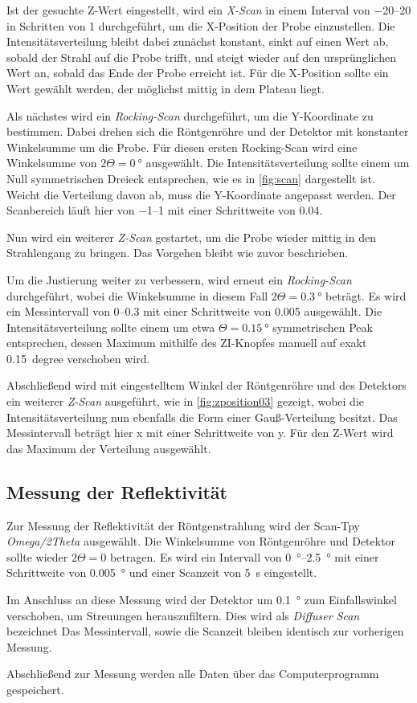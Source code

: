 Ist der gesuchte Z-Wert eingestellt,
wird ein \emph{X-Scan} in einem Interval von \numrange{-20}{20} in Schritten von \num{1} durchgeführt,
um die X-Position der Probe einzustellen.
Die Intensitätsverteilung bleibt dabei zunächst konstant,
sinkt auf einen Wert ab,
sobald der Strahl auf die Probe trifft,
und steigt wieder auf den ursprünglichen Wert an,
sobald das Ende der Probe erreicht ist.
Für die X-Position sollte ein Wert gewählt werden,
der möglichst mittig in dem Plateau liegt.

Als nächstes wird ein \emph{Rocking-Scan} durchgeführt,
um die Y-Koordinate zu bestimmen.
Dabei drehen sich die Röntgenröhre und der Detektor mit konstanter Winkelsumme um die Probe.
Für diesen ersten Rocking-Scan wird eine Winkelsumme von $2 \Theta = \SI{0}{\degree}$ ausgewählt.
Die Intensitätsverteilung sollte einem um Null symmetrischen Dreieck entsprechen,
wie es in \autoref{fig:scan} dargestellt ist.
Weicht die Verteilung davon ab,
muss die Y-Koordinate angepasst werden.
Der Scanbereich läuft hier von \numrange{-1}{1} mit einer Schrittweite von \num{0.04}.

Nun wird ein weiterer \emph{Z-Scan} gestartet,
um die Probe wieder mittig in den Strahlengang zu bringen.
Das Vorgehen bleibt wie zuvor beschrieben.

Um die Justierung weiter zu verbessern,
wird erneut ein \emph{Rocking-Scan} durchgeführt,
wobei die Winkelsumme in diesem Fall $2 \Theta = \SI{0.3}{\degree}$ beträgt.
Es wird ein Messintervall von \numrange{0}{0.3} mit einer Schrittweite von \num{0.005} ausgewählt.
Die Intensitätsverteilung sollte einem um etwa $\Theta = \SI{0.15}{\degree}$ symmetrischen Peak entsprechen,
dessen Maximum mithilfe des ZI-Knopfes manuell auf exakt \SI{0.15}{degree} verschoben wird.

Abschließend wird mit eingestelltem Winkel der Röntgenröhre und des Detektors ein weiterer \emph{Z-Scan} ausgeführt,
wie in \autoref{fig:zposition03} gezeigt,
wobei die Intensitätsverteilung nun ebenfalls die Form einer Gauß-Verteilung besitzt.
Das Messintervall beträgt hier x mit einer Schrittweite von y.
Für den Z-Wert wird das Maximum der Verteilung ausgewählt.

\subsection{Messung der Reflektivität}

Zur Messung der Reflektivität der Röntgenstrahlung wird der Scan-Tpy \emph{Omega/2Theta} ausgewählt.
Die Winkelsumme von Röntgenröhre und Detektor sollte wieder $2 \Theta = 0$ betragen.
Es wird ein Intervall von \SIrange{0}{2.5}{\degree} mit einer Schrittweite von \SI{0.005}{\degree} und einer Scanzeit von \SI{5}{\second} eingestellt.

Im Anschluss an diese Messung wird der Detektor um \SI{0.1}{\degree} zum Einfallswinkel verschoben,
um Streuungen herauszufiltern.
Dies wird als \emph{Diffuser Scan} bezeichnet
Das Messintervall,
sowie die Scanzeit bleiben identisch zur vorherigen Messung.

Abschließend zur Messung werden alle Daten über das Computerprogramm gespeichert.
